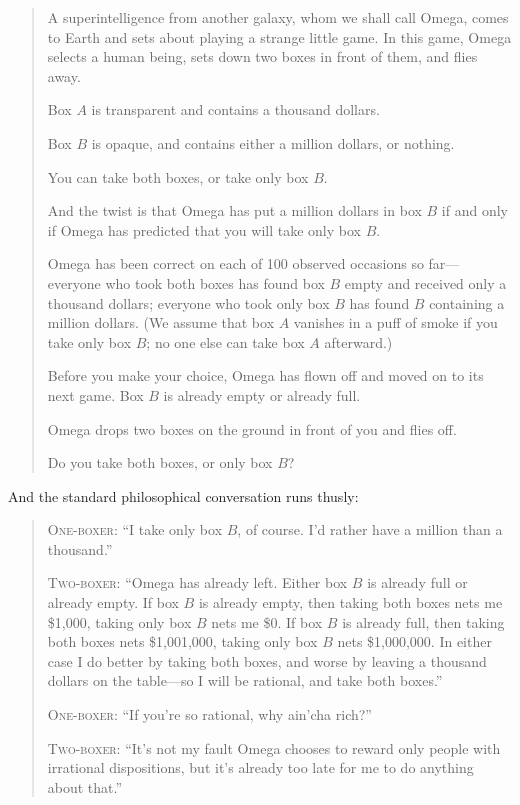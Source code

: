 \begin{quotation}

 A superintelligence from another galaxy, whom we shall call Omega,
comes to Earth and sets about playing a strange little game. In this
game, Omega selects a human being, sets down two boxes in front of
them, and flies away.


 Box $A$ is transparent and contains a thousand dollars.


 Box $B$ is opaque, and contains either a million dollars, or
nothing.


 You can take both boxes, or take only box $B$.


 And the twist is that Omega has put a million dollars in box $B$ if
and only if Omega has predicted that you will take only box $B$.


 Omega has been correct on each of 100 observed occasions so
far---everyone who took both boxes has found box $B$ empty and received
only a thousand dollars; everyone who took only box $B$ has found $B$
containing a million dollars. (We assume that box $A$ vanishes in a puff
of smoke if you take only box $B$; no one else can take box $A$
afterward.)


 Before you make your choice, Omega has flown off and moved on to
its next game. Box $B$ is already empty or already full.


 Omega drops two boxes on the ground in front of you and flies
off.

{
  Do you take both boxes, or only box $B$?}
\end{quotation}


 And the standard philosophical conversation runs thusly:

\begin{quotation}

 \textsc{One-boxer}: ``I take only box $B$, of course.
I'd rather have a million than a
thousand.''


 \textsc{Two-boxer}: ``Omega has already left. Either box $B$
is already full or already empty. If box $B$ is already empty, then
taking both boxes nets me \$1,000, taking only box $B$ nets me \$0. If
box $B$ is already full, then taking both boxes nets \$1,001,000, taking
only box $B$ nets \$1,000,000. In either case I do better by taking both
boxes, and worse by leaving a thousand dollars on the table---so I will
be rational, and take both boxes.''


 \textsc{One-boxer}: ``If you're so
rational, why ain'cha rich?''

{
 \textsc{Two-boxer}: ``It's not my fault
Omega chooses to reward only people with irrational dispositions, but
it's already too late for me to do anything about
that.''}
\end{quotation}

